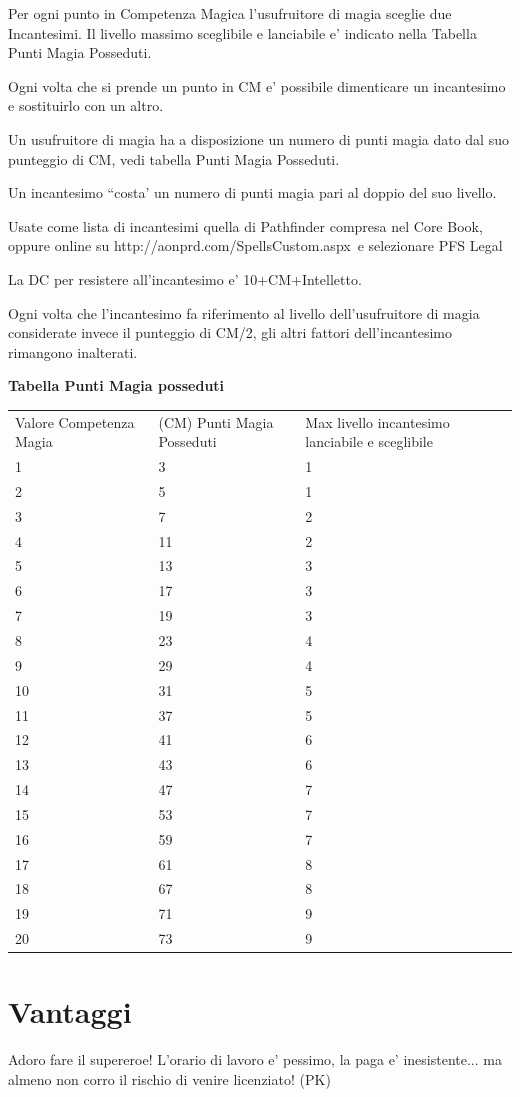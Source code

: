 \documentclass[a4paper,11pt,twoside,openany]{dndbook}
\begin{document}
Per ogni punto in Competenza Magica l'usufruitore di magia sceglie due Incantesimi. Il livello massimo sceglibile e lanciabile e' indicato nella Tabella Punti Magia Posseduti.

Ogni volta che si prende un punto in CM e' possibile dimenticare un incantesimo e sostituirlo con un altro.

Un usufruitore di magia ha a disposizione un numero di punti magia dato dal suo punteggio di CM, vedi tabella Punti Magia Posseduti.

Un incantesimo ``costa' un numero di punti magia pari al doppio del suo livello.

Usate come lista di incantesimi quella di Pathfinder compresa nel Core Book, oppure online su http://aonprd.com/SpellsCustom.aspx\ e selezionare PFS Legal

La DC per resistere all'incantesimo e' 10+CM+Intelletto.

Ogni volta che l'incantesimo fa riferimento al livello dell'usufruitore di magia considerate invece il punteggio di CM/2, gli altri fattori dell'incantesimo rimangono inalterati.

\bigskip

\textbf{Tabella Punti Magia posseduti}

\bigskip

\begin{longtable}[c]{@{}lll@{}}
\toprule 
Valore Competenza Magia
& (CM) Punti Magia Posseduti & Max livello incantesimo lanciabile e sceglibile\\
1 & 3 & 1\tabularnewline
2 & 5 & 1\tabularnewline
3 & 7 & 2\tabularnewline
4 & 11 & 2\tabularnewline
5 & 13 & 3\tabularnewline
6 & 17 & 3\tabularnewline
7 & 19 & 3\tabularnewline
8 & 23 & 4\tabularnewline
9 & 29 & 4\tabularnewline
10 & 31 & 5\tabularnewline
11 & 37 & 5\tabularnewline
12 & 41 & 6\tabularnewline
13 & 43 & 6\tabularnewline
14 & 47 & 7\tabularnewline
15 & 53 & 7\tabularnewline
16 & 59 & 7\tabularnewline
17 & 61 & 8\tabularnewline
18 & 67 & 8\tabularnewline
19 & 71 & 9\tabularnewline
20 & 73 & 9\tabularnewline
\bottomrule
\end{longtable}

\pagebreak

\section{Vantaggi}

\label{vantaggi}
\begin{quotebox}
Adoro fare il supereroe! L'orario di lavoro e' pessimo, la paga e' inesistente... ma almeno non corro il rischio di venire licenziato! (PK)
\end{quotebox}
\end{document}
